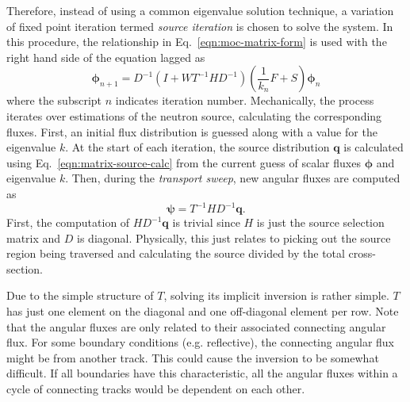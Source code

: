 Therefore, instead of using a common eigenvalue solution technique, a variation of fixed point iteration termed \textit{source iteration} is chosen to solve the system. In this procedure, the relationship in Eq.~\ref{eqn:moc-matrix-form} is used with the right hand side of the equation lagged as
\begin{equation}
\boldsymbol{\phi}_{n+1} = D^{-1}\left( I + W T^{-1} H D^{-1}\right) \left(\frac{1}{k_n} F + S \right) \boldsymbol{\phi}_n
\end{equation}
where the subscript $n$ indicates iteration number. Mechanically, the process iterates over estimations of the neutron source, calculating the corresponding fluxes. First, an initial flux distribution is guessed along with a value for the eigenvalue $k$. At the start of each iteration, the source distribution $\mathbf{q}$ is calculated using Eq.~\ref{eqn:matrix-source-calc} from the current guess of scalar fluxes $\boldsymbol{\phi}$ and eigenvalue $k$. Then, during the \textit{transport sweep}, new angular fluxes are computed as
\begin{equation}
\boldsymbol{\psi} = T^{-1} H D^{-1} \mathbf{q}.
\end{equation}
First, the computation of $HD^{-1}\mathbf{q}$ is trivial since $H$ is just the source selection matrix and $D$ is diagonal. Physically, this just relates to picking out the source region being traversed and calculating the source divided by the total cross-section.

Due to the simple structure of $T$, solving its implicit inversion is rather simple. $T$ has just one element on the diagonal and one off-diagonal element per row. Note that the angular fluxes are only related to their associated connecting angular flux. For some boundary conditions (e.g. reflective), the connecting angular flux might be from another track. This could cause the inversion to be somewhat difficult. If all boundaries have this characteristic, all the angular fluxes within a cycle of connecting tracks would be dependent on each other.

